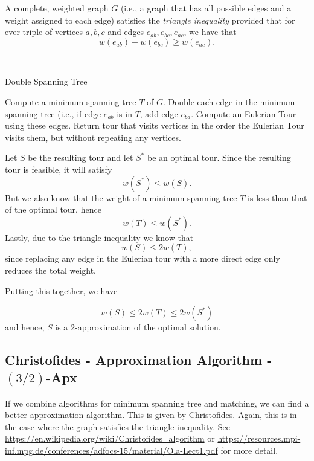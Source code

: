 \documentclass[../open-optimization/open-optimization.tex]{subfiles}
\begin{document}
\begin{definition}
A complete, weighted graph $G$ (i.e., a graph that has all possible edges and a weight assigned to each edge) satisfies the \emph{triangle inequality} provided that for ever triple of vertices $a,b,c$ and edges $e_{ab}, e_{bc}, e_{ac}$, we have that 
\[
w(e_{ab}) + w(e_{bc}) \geq w(e_{ac}).
\]
\end{definition}



\begin{algorithm}
\\
\caption{Double Spanning Tree}\label{alg:double-spanning-tree}
\begin{algorithmic}[1]
	\State Compute a minimum spanning tree $T$ of $G$.
 	\State Double each edge in the minimum spanning tree (i.e., if edge $e_{ab}$ is in $T$, add edge $e_{ba}$. 
	\State Compute an Eulerian Tour  using these edges.
	\State Return tour that visits vertices in the order the Eulerian Tour visits them, but without repeating any vertices.
	\end{algorithmic}
\end{algorithm}

Let $S$ be the resulting tour and let $S^*$ be an optimal tour.
Since the resulting tour is feasible, it will satisfy 
\[
w(S^*) \leq w(S).
\]
But we also know that the weight of a minimum spanning tree $T$ is less than that of the optimal tour, hence
\[
w(T) \leq w(S^*).
\]
Lastly, due to the triangle inequality we know that 
\[
w(S) \leq 2 w(T),
\]
since replacing any edge in the Eulerian tour with a more direct edge only reduces the total weight.

Putting this together, we have

\[w(S) \leq 2w(T) \leq 2 w(S^*)\]
and hence, $S$ is a 2-approximation of the optimal solution.


\subsection{Christofides - Approximation Algorithm - $(3/2)$-Apx}
If we combine algorithms for minimum spanning tree and matching, we can find a better approximation algorithm.  This is given by Christofides.  Again, this is in the case where the graph satisfies the triangle inequality.  See 
\url{https://en.wikipedia.org/wiki/Christofides_algorithm} or \url{https://resources.mpi-inf.mpg.de/conferences/adfocs-15/material/Ola-Lect1.pdf} for more detail.
\end{document}
